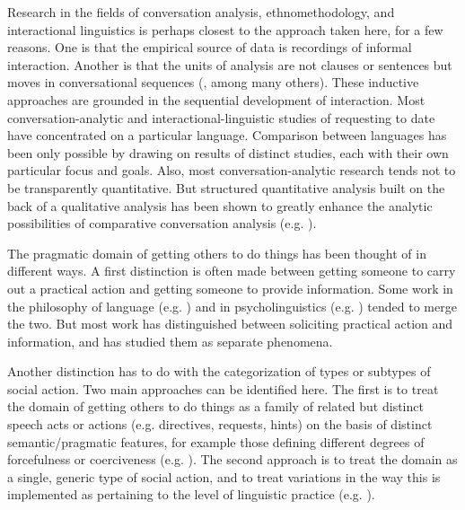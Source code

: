 \documentclass[output=paper,modfonts,nonflat]{langsci/langscibook}
\begin{document}
Research in the fields of conversation analysis, ethnomethodology, and interactional linguistics is perhaps closest to the approach taken here, for a few reasons. One is that the empirical source of data is recordings of informal interaction. Another is that the units of analysis are not clauses or sentences but moves in conversational sequences (\citealt{Wootton1981,Wootton1997,Lindström2005,VinkhuyzenSzymanski2005,Heinemann2006,CurlDrew2008,CravenPotter2010,ZinkenOgiermann2013,DrewCouper-Kuhlen2014a}, among many others). These inductive approaches are grounded in the sequential development of interaction. Most conversation-analytic and interactional-linguistic studies of requesting to date have concentrated on a particular language. Comparison between languages has been only possible by drawing on results of distinct studies, each with their own particular focus and goals. Also, most conversation-analytic research tends not to be transparently quantitative. But structured quantitative analysis built on the back of a qualitative analysis has been shown to greatly enhance the analytic possibilities of comparative conversation analysis (e.g. \citealt{FoxEtAl2009,RossanoEtAl2009,StiversEtAl2009,DingemanseEtAl2015}).

The pragmatic domain of getting others to do things has been thought of in different ways. A first distinction is often made between getting someone to carry out a practical action and getting someone to provide information. Some work in the philosophy of language (e.g. \citealt{Searle1969}) and in psycholinguistics (e.g. \citealt{Clark1979,ClarkSchunk1980}) tended to merge the two. But most work has distinguished between soliciting practical action and information, and has studied them as separate phenomena. 

Another distinction has to do with the categorization of types or subtypes of social action. Two main approaches can be identified here. The first is to treat the domain of getting others to do things as a family of related but distinct speech acts or actions (e.g. directives, requests, hints) on the basis of distinct semantic/pragmatic features, for example those defining different degrees of forcefulness or coerciveness (e.g. \citealt{Searle1976,Wierzbicka1991,CravenPotter2010}). The second approach is to treat the domain as a single, generic type of social action, and to treat variations in the way this is implemented as pertaining to the level of linguistic practice (e.g. \citealt{Ervin-TrippEtAl1990,Wootton1997,Rossi2012}). 
\end{document}
